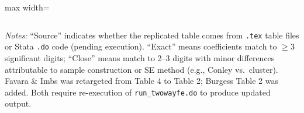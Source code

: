 \documentclass[11pt,a4paper]{article}
\begin{document}
\begin{table}[H]
\begin{adjustbox}{max width=\textwidth}
\begin{tabular}{clllccc}
\bottomrule
\end{tabular}
\end{adjustbox}
\vspace{0.5cm}
\parbox{0.95\textwidth}{\footnotesize\textit{Notes:} ``Source'' indicates whether the replicated table comes from \texttt{.tex} table files or Stata \texttt{.do} code (pending execution). ``Exact'' means coefficients match to $\geq$3 significant digits; ``Close'' means match to 2--3 digits with minor differences attributable to sample construction or SE method (e.g., Conley vs.\ cluster). Favara \& Imbs was retargeted from Table 4 to Table 2; Burgess Table 2 was added. Both require re-execution of \texttt{run\_twowayfe.do} to produce updated output.}
\end{table}
\end{document}
